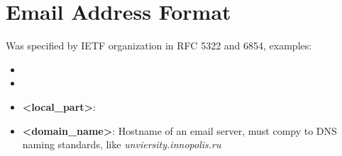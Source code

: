 \documentclass{article}
\begin{document}
\section*{Email Address Format}

Was specified by IETF organization in RFC 5322 and 6854, examples:

\begin{itemize}
	\item {}
	\item {}
\end{itemize}


\begin{itemize}
  \item \textbf{<local_part>}:  
  \item \textbf{<domain_name>}: Hostname of an email server, must compy to DNS naming standards, like \textit{unviersity.innopolis.ru}  
\end{itemize}
\end{document}
